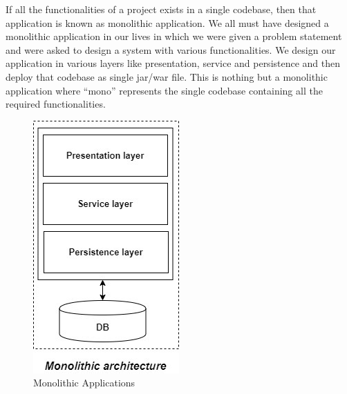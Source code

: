 If all the functionalities of a project exists in a single codebase, then that application is known as monolithic application. We all must have designed a monolithic application in our lives in which we were given a problem statement and were asked to design a system with various functionalities. We design our application in various layers like presentation, service and persistence and then deploy that codebase as single jar/war file. This is nothing but a monolithic application where “mono” represents the single codebase containing all the required functionalities.
\begin{figure}[!ht]
    \center
    \includegraphics[scale=0.60]{assets/monolithic.jpg}
    \caption{Monolithic Applications}
    \label{fig:monoapp}
\end{figure}

